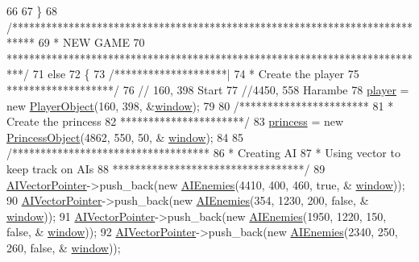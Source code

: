\begin{DoxyCode}
66 
67     \}
68     \textcolor{comment}{/****************************************************************************}
69 \textcolor{comment}{     *                             NEW GAME}
70 \textcolor{comment}{     ***************************************************************************/}
71     \textcolor{keywordflow}{else}
72     \{
73         \textcolor{comment}{/********************|}
74 \textcolor{comment}{         * Create the player}
75 \textcolor{comment}{         *******************/}
76         \textcolor{comment}{// 160, 398 Start}
77         \textcolor{comment}{//4450, 558 Harambe}
78         \hyperlink{classTestApp_a72c21fba56a65699606328b9e765d6db}{player} = \textcolor{keyword}{new} \hyperlink{classPlayerObject}{PlayerObject}(160, 398, &\hyperlink{classTestApp_a0b6b080a777092db64519ef7c4309105}{window});
79 
80         \textcolor{comment}{/***********************}
81 \textcolor{comment}{         *  Create the princess}
82 \textcolor{comment}{         **********************/}
83         \hyperlink{classTestApp_a99d5d1cabf9afb7550bac5a504f72875}{princess} = \textcolor{keyword}{new} \hyperlink{classPrincessObject}{PrincessObject}(4862, 550, 50, &
      \hyperlink{classTestApp_a0b6b080a777092db64519ef7c4309105}{window});
84 
85         \textcolor{comment}{/***********************************}
86 \textcolor{comment}{         * Creating AI}
87 \textcolor{comment}{         * Using vector to keep track on AIs}
88 \textcolor{comment}{         **********************************/}
89         \hyperlink{classTestApp_ac409d674f567c5d2ea773bd7ec3036d9}{AIVectorPointer}->push\_back(\textcolor{keyword}{new} \hyperlink{classAIEnemies}{AIEnemies}(4410, 400, 460, \textcolor{keyword}{true}, &
      \hyperlink{classTestApp_a0b6b080a777092db64519ef7c4309105}{window}));
90         \hyperlink{classTestApp_ac409d674f567c5d2ea773bd7ec3036d9}{AIVectorPointer}->push\_back(\textcolor{keyword}{new} \hyperlink{classAIEnemies}{AIEnemies}(354, 1230, 200, \textcolor{keyword}{false}, &
      \hyperlink{classTestApp_a0b6b080a777092db64519ef7c4309105}{window}));
91         \hyperlink{classTestApp_ac409d674f567c5d2ea773bd7ec3036d9}{AIVectorPointer}->push\_back(\textcolor{keyword}{new} \hyperlink{classAIEnemies}{AIEnemies}(1950, 1220, 150, \textcolor{keyword}{false}, &
      \hyperlink{classTestApp_a0b6b080a777092db64519ef7c4309105}{window}));
92         \hyperlink{classTestApp_ac409d674f567c5d2ea773bd7ec3036d9}{AIVectorPointer}->push\_back(\textcolor{keyword}{new} \hyperlink{classAIEnemies}{AIEnemies}(2340, 250, 260, \textcolor{keyword}{false}, &
      \hyperlink{classTestApp_a0b6b080a777092db64519ef7c4309105}{window}));

\end{DoxyCode}
